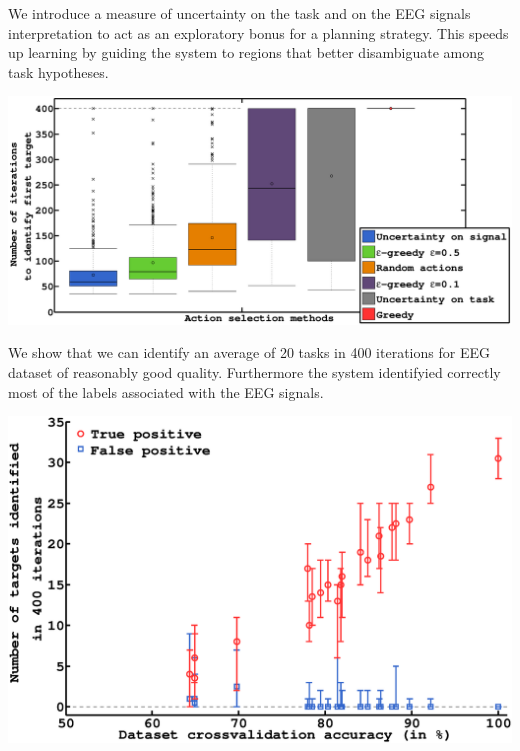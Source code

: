 \documentclass[a0,final, portrait]{inriaposter}
\begin{document}
\begin{multicols}{2}
{\vspace{1cm}

We introduce a measure of uncertainty on the task and on the EEG signals interpretation to act as an exploratory bonus for a planning strategy. This speeds up learning by guiding the system to regions that better disambiguate among task hypotheses. 

\vspace{1cm}

\begin{center}
\includegraphics[width=0.85\columnwidth]{images/plot_planning_first}
\end{center}

\vspace{1cm}

We show that we can identify an average of 20 tasks in 400 iterations for EEG dataset of reasonably good quality. Furthermore the system identifyied correctly most of the labels associated with the EEG signals.

\vspace{1cm}

\begin{center}
\begin{minipage}{.46\columnwidth}
\begin{center}
\includegraphics[width=\columnwidth]{images/plot_first400_reach}
\end{center}
\end{minipage}
\begin{minipage}{.02\columnwidth}
	\begin{center}


\end{center}
\end{minipage}
\end{center}}
\end{multicols}
\end{document}
